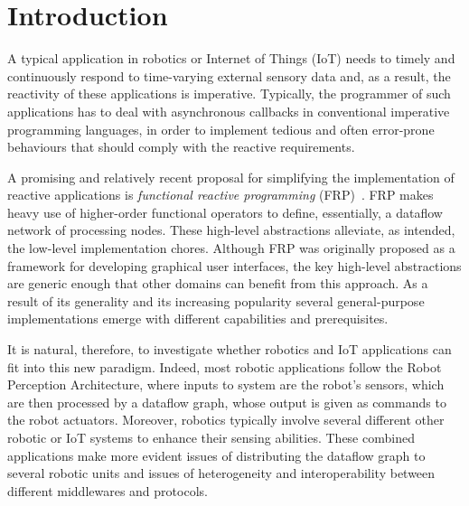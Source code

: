 \documentclass[sigplan,screen,10pt]{acmart}
\begin{document}


\maketitle

\section{Introduction} \label{sec:introduction}

A typical application in robotics or Internet of Things (IoT) needs to timely and
continuously respond to time-varying external sensory data and, as a result, the
reactivity of these applications is imperative. Typically, the programmer of such
applications has to deal with asynchronous callbacks in conventional imperative
programming languages, in order to implement tedious and often error-prone behaviours
that should comply with the reactive requirements.

A promising and relatively recent proposal for simplifying the implementation of
reactive applications is \emph{functional reactive programming} (FRP)~\cite{fran}.
FRP makes heavy use of higher-order functional operators to define, essentially, a
dataflow network of processing nodes. These high-level abstractions
alleviate, as intended, the low-level implementation chores. Although FRP was originally
proposed as a framework for developing graphical user interfaces, the key high-level
abstractions are generic enough that other domains can benefit from this
approach. As a result of its generality and its increasing popularity several
general-purpose implementations emerge with different capabilities and prerequisites.

It is natural, therefore, to investigate whether robotics and IoT applications
can fit into this new paradigm. Indeed, most robotic applications follow the
Robot Perception Architecture, where inputs to system are the robot's
sensors, which are then processed by a dataflow graph, whose output is given as
commands to the robot actuators. Moreover, robotics typically involve several
different other robotic or IoT systems to enhance their sensing abilities. These
combined applications make more evident issues of distributing the dataflow graph to
several robotic units and issues of heterogeneity and interoperability between
different middlewares and protocols.
\end{document}
